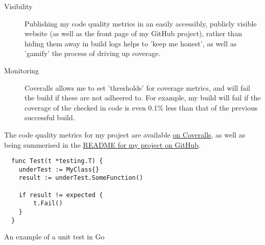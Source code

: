 \begin{description}
  \item[Visibility] Publishing my code quality metrics in an easily accessibly,
  publicly visible website (as well as the front page of my GitHub project),
  rather than hiding them away in build logs helps to
  'keep me honest', as well as 'gamify' the process of driving up coverage.
  \item[Monitoring] Coveralls allows me to set 'thresholds' for coverage metrics,
  and will fail the build if these are not adheered to. For example, my build will
  fail if the coverage of the checked in code is even 0.1\% less than that of the
  previous successful build.
\end{description}

The code quality metrics for my project are available
\href{https://coveralls.io/github/FireEater64/gamq?branch=master}{on Coveralls},
as well as being summerised in the
\href{https://github.com/FireEater64/gamq/blob/master/README.md}{README for my project on GitHub}.

\begin{listing}[ht]
\begin{verbatim}
  func Test(t *testing.T) {
  	underTest := MyClass{}
  	result := underTest.SomeFunction()

  	if result != expected {
  		t.Fail()
  	}
  }
\end{verbatim}
\caption{An example of a unit test in Go}
\label{lst:goUnitTest}
\end{listing}
